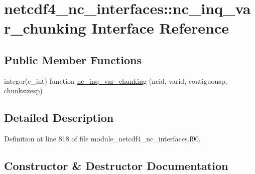 \hypertarget{interfacenetcdf4__nc__interfaces_1_1nc__inq__var__chunking}{}\section{netcdf4\+\_\+nc\+\_\+interfaces\+:\+:nc\+\_\+inq\+\_\+var\+\_\+chunking Interface Reference}
\label{interfacenetcdf4__nc__interfaces_1_1nc__inq__var__chunking}
\subsection*{Public Member Functions}
\begin{DoxyCompactItemize}
\item 
integer(c\+\_\+int) function \hyperlink{interfacenetcdf4__nc__interfaces_1_1nc__inq__var__chunking_a2ef1581d1ac758951c75be1ed916121e}{nc\+\_\+inq\+\_\+var\+\_\+chunking} (ncid, varid, contiguousp, chunksizesp)
\end{DoxyCompactItemize}


\subsection{Detailed Description}


Definition at line 818 of file module\+\_\+netcdf4\+\_\+nc\+\_\+interfaces.\+f90.



\subsection{Constructor \& Destructor Documentation}
\mbox{\label{interfacenetcdf4__nc__interfaces_1_1nc__inq__var__chunking_a2ef1581d1ac758951c75be1ed916121e}} 
